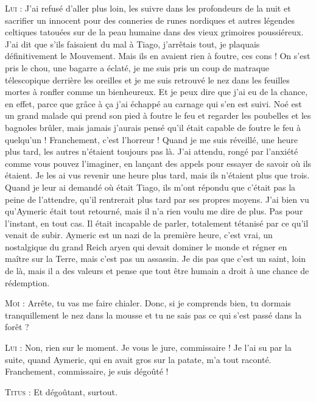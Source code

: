 \begin{dialogue}
\textsc{Lui} : J’ai refusé d’aller plus loin, les suivre dans les profondeurs de la nuit et sacrifier un innocent pour des conneries de runes nordiques et autres légendes celtiques tatouées sur de la peau humaine dans des vieux grimoires poussiéreux. J’ai dit que s’ils faisaient du mal à Tiago, j’arrêtais tout, je plaquais définitivement le Mouvement. Mais ils en avaient rien à foutre, ces cons ! On s’est pris le chou, une bagarre a éclaté, je me suis pris un coup de matraque télescopique derrière les oreilles et je me suis retrouvé le nez dans les feuilles mortes à ronfler comme un bienheureux. Et je peux dire que j’ai eu de la chance, en effet, parce que grâce à ça j’ai échappé au carnage qui s’en est suivi. Noé est un grand malade qui prend son pied à foutre le feu et regarder les poubelles et les bagnoles brûler, mais jamais j’aurais pensé qu’il était capable de foutre le feu à quelqu’un ! Franchement, c’est l’horreur ! Quand je me suis réveillé, une heure plus tard, les autres n’étaient toujours pas là. J’ai attendu, rongé par l’anxiété comme vous pouvez l’imaginer, en lançant des appels pour essayer de savoir où ils étaient. Je les ai vus revenir une heure plus tard, mais ils n’étaient plus que trois. Quand je leur ai demandé où était Tiago, ils m’ont répondu que c’était pas la peine de l’attendre, qu’il rentrerait plus tard par ses propres moyens. J’ai bien vu qu’Aymeric était tout retourné, mais il n’a rien voulu me dire de plus. Pas pour l’instant, en tout cas. Il était incapable de parler, totalement tétanisé par ce qu’il venait de subir. Aymeric est un nazi de la première heure, c’est vrai, un nostalgique du grand Reich aryen qui devait dominer le monde et régner en maître sur la Terre, mais c’est pas un assassin. Je dis pas que c’est un saint, loin de là, mais il a des valeurs et pense que tout être humain a droit à une chance de rédemption.

\textsc{Moi} : Arrête, tu vas me faire chialer. Donc, si je comprends bien, tu dormais tranquillement le nez dans la mousse et tu ne sais pas ce qui s’est passé dans la forêt ?

\textsc{Lui} : Non, rien sur le moment. Je vous le jure, commissaire ! Je l’ai su par la suite, quand Aymeric, qui en avait gros sur la patate, m’a tout raconté. Franchement, commissaire, je suis dégoûté !

\textsc{Titus} : Et dégoûtant, surtout.

\end{dialogue}

